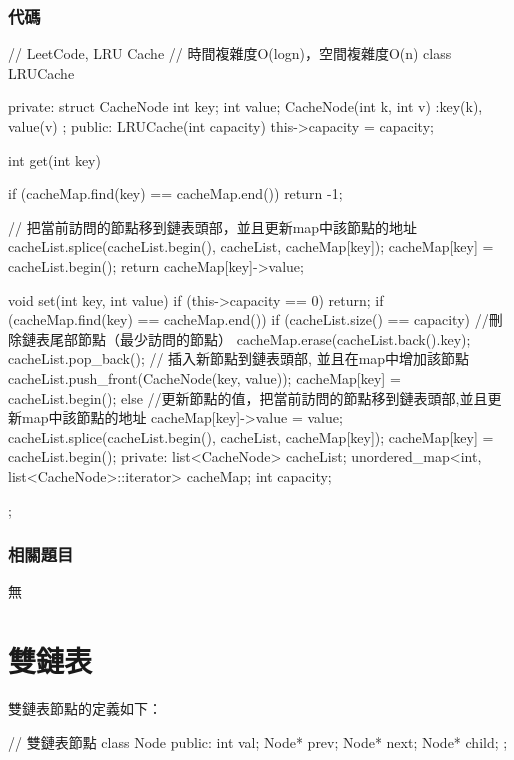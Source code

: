 \subsubsection{代碼}
\begin{Code}
// LeetCode, LRU Cache
// 時間複雜度O(logn)，空間複雜度O(n)
class LRUCache{
private:
    struct CacheNode {
        int key;
        int value;
        CacheNode(int k, int v) :key(k), value(v){}
    };
public:
    LRUCache(int capacity) {
        this->capacity = capacity;
    }

    int get(int key) {
        if (cacheMap.find(key) == cacheMap.end()) return -1;

        // 把當前訪問的節點移到鏈表頭部，並且更新map中該節點的地址
        cacheList.splice(cacheList.begin(), cacheList, cacheMap[key]);
        cacheMap[key] = cacheList.begin();
        return cacheMap[key]->value;
    }

    void set(int key, int value) {
        if (this->capacity == 0) return;
        if (cacheMap.find(key) == cacheMap.end()) {
            if (cacheList.size() == capacity) { //刪除鏈表尾部節點（最少訪問的節點）
                cacheMap.erase(cacheList.back().key);
                cacheList.pop_back();
            }
            // 插入新節點到鏈表頭部, 並且在map中增加該節點
            cacheList.push_front(CacheNode(key, value));
            cacheMap[key] = cacheList.begin();
        } else {
            //更新節點的值，把當前訪問的節點移到鏈表頭部,並且更新map中該節點的地址
            cacheMap[key]->value = value;
            cacheList.splice(cacheList.begin(), cacheList, cacheMap[key]);
            cacheMap[key] = cacheList.begin();
        }
    }
private:
    list<CacheNode> cacheList;
    unordered_map<int, list<CacheNode>::iterator> cacheMap;
    int capacity;
};
\end{Code}


\subsubsection{相關題目}
\begindot
\item 無
\myenddot

\section{雙鏈表} %

雙鏈表節點的定義如下：
\begin{Code}
// 雙鏈表節點
class Node {
public:
    int val;
    Node* prev;
    Node* next;
    Node* child;
};
\end{Code}

